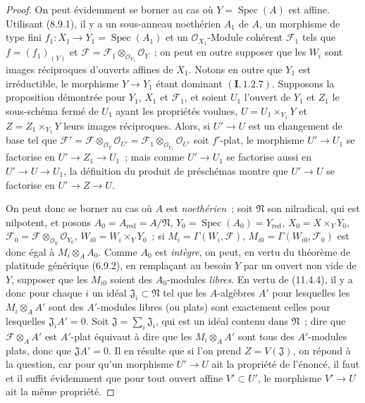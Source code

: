 \begin{proof}
On peut évidemment se borner au cas où $Y=\operatorname{Spec}(A)$ est affine.
Utilisant (8.9.1), il y a un sous-anneau noethérien $A_1$ de $A$, un morphisme
de type fini $f_1:X_1\to Y_1=\operatorname{Spec}(A_1)$ et un
$\mathcal O_{X_1}$-Module cohérent $\mathcal F_1$ tels que $f=(f_1)_{(Y)}$ et
$\mathcal F=\mathcal F_1\otimes_{\mathcal O_{Y_1}}\mathcal O_Y$~; on peut en
outre supposer que les $W_i$ sont images réciproques d'ouverts affines de
$X_1$. Notons en outre que $Y_1$ est irréductible, le morphisme $Y\to Y_1$
étant dominant $(\mathbf I,1.2.7)$. Supposons la proposition démontrée pour
$Y_1$, $X_1$ et $\mathcal F_1$, et soient $U_1$ l'ouvert de $Y_1$ et $Z_1$ le
sous-schéma fermé de $U_1$ ayant les propriétés voulues, $U=U_1\times_{Y_1}Y$
et $Z=Z_1\times_{Y_1}Y$ leurs images réciproques. Alors, si $U'\to U$ est un
changement de base tel que
$\mathcal F'=\mathcal F\otimes_{\mathcal O_Y}\mathcal O_{U'}
=\mathcal F_1\otimes_{\mathcal O_{Y_1}}\mathcal O_{U'}$ soit $f'$-plat, le
morphisme $U'\to U_1$ se factorise en $U'\to Z_1\to U_1$~; mais comme
$U'\to U_1$ se factorise aussi en $U'\to U\to U_1$, la définition du produit
de préschémas montre que $U'\to U$ se factorise en $U'\to Z\to U$.

On peut donc se borner au cas où $A$ est \emph{noethérien}~; soit
$\mathfrak N$ son nilradical, qui est nilpotent, et posons
$A_0=A_{\mathrm{red}}=A/\mathfrak N$,
$Y_0=\operatorname{Spec}(A_0)=Y_{\mathrm{red}}$,
$X_0=X\times_YY_0$, $\mathcal F_0=\mathcal F\otimes_{\mathcal O_Y}
\mathcal O_{Y_0}$, $W_{i0}=W_i\times_YY_0$~; si
$M_i=\Gamma(W_i,\mathcal F)$, $M_{i0}=\Gamma(W_{i0},\mathcal F_0)$ est donc
égal à $M_i\otimes_A A_0$. Comme $A_0$ est \emph{intègre}, on peut, en vertu du
théorème de platitude générique (6.9.2), en remplaçant au besoin $Y$ par un
ouvert non vide de $Y$, supposer que les $M_{i0}$ soient des $A_0$-modules
\emph{libres}. En vertu de (11.4.4), il y a donc pour chaque $i$ un idéal
$\mathfrak J_i\subset\mathfrak N$ tel
que les $A$-algèbres $A'$ pour lesquelles les $M_i\otimes_A A'$ sont des
$A'$-modules libres (ou plats) sont exactement celles pour lesquelles
$\mathfrak J_iA'=0$. Soit $\mathfrak J=\sum_i\mathfrak J_i$, qui est un idéal
contenu dans $\mathfrak N$~; dire que $\mathcal F\otimes_A A'$ est $A'$-plat
équivaut à dire que les $M_i\otimes_A A'$ sont tous des $A'$-modules plats,
donc que $\mathfrak JA'=0$. Il en résulte que si l'on prend
$Z=V(\mathfrak J)$, on répond à la question, car pour qu'un morphisme
$U'\to U$ ait la propriété de l'énoncé, il faut et il suffit évidemment que
pour tout ouvert affine $V'\subset U'$, le morphisme $V'\to U$ ait la même
propriété.
\end{proof}

